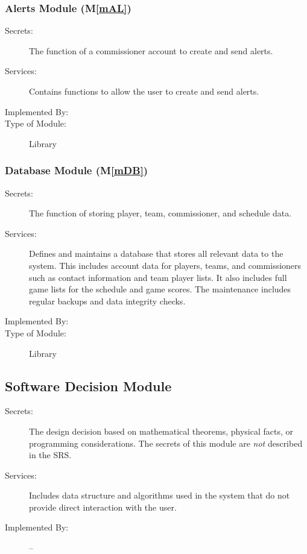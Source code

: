 \documentclass[12pt, titlepage]{article}
\newcommand{\mref}[1]{M\ref{#1}}
\begin{document}
\subsubsection{Alerts Module (\mref{mAL})}

\begin{description}
  \item[Secrets:]The function of a commissioner account to create and send
  alerts.
  \item[Services:]Contains functions to allow the user to create and send alerts.
  \item[Implemented By:] \progname{}
  \item[Type of Module:] Library
\end{description}

\subsubsection{Database Module (\mref{mDB})}

\begin{description}
  \item[Secrets:]The function of storing player, team, commissioner, and schedule data.
  \item[Services:]Defines and maintains a database that stores all relevant data
  to the \progname{} system. This includes account data for players, teams, and
  commissioners such as contact information and team player lists. It also
  includes full game lists for the schedule and game scores. The maintenance
  includes regular backups and data integrity checks.
  \item[Implemented By:] \progname{}
  \item[Type of Module:] Library
\end{description}


\subsection{Software Decision Module}

\begin{description}
  \item[Secrets:] The design decision based on mathematical theorems, physical
  facts, or programming considerations. The secrets of this module are
  \emph{not} described in the SRS.
  \item[Services:] Includes data structure and algorithms used in the system that
  do not provide direct interaction with the user. 
  \item[Implemented By:] --
\end{description}
\end{document}
